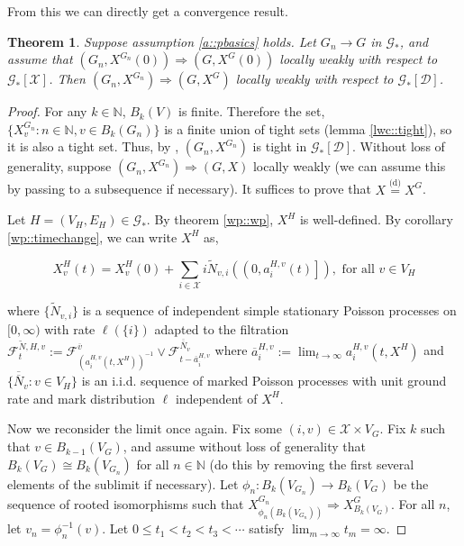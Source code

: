 \documentclass[12pt]{article}
\newcommand{\mb}{\mathbb}
\newcommand{\mc}{\mathcal}
\newcommand{\ra}{\rightarrow}
\newcommand{\ov}{\overline}
\newcommand{\te}{\text}
\newcommand{\ind}{\hspace{24pt}}
\newcommand{\deq}{\overset{\text{(d)}}{=}}			%
\newcommand{\defeq}{:=}								%
\newcommand{\cad}{\mc{D}}							%
\newcommand{\sta}{\mc{X}}							%
\newcommand{\cl}[1]{\ov{#1}}						%
\newcommand{\Xf}{X}									%
\newcommand{\poiss}{N}								%
\newcommand{\Sm}{\ell}								%
\newcommand{\F}{\mc{F}}								%
\newcommand{\poissv}[1]{_{#1}}						%
\newcommand{\vind}[1]{_{#1}}						%
\newcommand{\tme}[1]{(#1)}							%
\newcommand{\gind}[1]{^{#1}}						%
\newcommand{\vpara}[1]{^{#1}}						%
\newcommand{\stpara}[1]{_{#1}}						%
\newcommand{\tpara}[1]{_{#1}}						%
\newcommand{\gvpara}[2]{^{#1,#2}}					%
\newcommand{\tmepro}[2]{(#1,#2)}					%
\newcommand{\Gs}{\mc{G}_\ast}						%
\newcommand{\compen}{a}								%
\newcommand{\compenbd}{\ov{a}}						%
\newcommand{\binver}[1]{(#1)^{-1}}					%
\newcommand{\trnc}[1]{B_{#1}}						%
\renewcommand{\sp}[1]{[#1]}							%
\newcommand{\alt}[1]{\tilde{#1}}					%
\renewcommand{\it}[1]{_{#1}}						%
\newtheorem{thms}{Theorem}[section]
\begin{document}
From this we can directly get a convergence result.

\begin{thms}
Suppose assumption \ref{a::pbasics} holds. Let \(G\it{n} \ra G\) in \(\Gs\), and assume that \((G\it{n},\Xf\gind{G\it{n}}\tme{0}) \Rightarrow (G,\Xf\gind{G}\tme{0})\) locally weakly with respect to \(\Gs\sp{\sta}\). Then \((G\it{n},\Xf\gind{G\it{n}}) \Rightarrow (G,\Xf\gind{G})\) locally weakly with respect to \(\Gs\sp{\cad}\).
\label{lwc::lwcthm}
\end{thms}
\begin{proof}
For any \(k \in \mb{N}\), \(\trnc{k}(V)\) is finite. Therefore the set, \(\{\Xf\gind{G\it{n}}\vind{v}: n \in \mb{N}, v \in \trnc{k}(G\it{n})\}\) is a finite union of tight sets (lemma \ref{lwc::tight}), so it is also a tight set. Thus, by \cite[Lemma A.6]{LacRamWu19}, \((G\it{n},\Xf\gind{G\it{n}})\) is tight in \(\Gs\sp{\cad}\). Without loss of generality, suppose \((G\it{n},\Xf\gind{G\it{n}}) \Rightarrow (G,\Xf)\) locally weakly (we can assume this by passing to a subsequence if necessary). It suffices to prove that \(\Xf \deq \Xf\gind{G}\).

\ind Let \(H = (V_H,E_H)\in \Gs\). By theorem \ref{wp::wp}, \(\Xf\gind{H}\) is well-defined. By corollary \ref{wp::timechange}, we can write \(\Xf\gind{H}\) as,

\[\Xf\gind{H}\vind{v}\tme{t} = \Xf\gind{H}\vind{v}\tme{0} + \sum_{i\in \sta} i\alt{\poiss}_{v,i}\left(\left(0, \compen\gvpara{H}{v}\stpara{i}\tme{t}\right]\right),\te{ for all } v \in V_H\]

where \(\{\alt{\poiss}_{v,i}\}\) is a sequence of independent simple stationary Poisson processes on \([0,\infty)\) with rate \(\Sm(\{i\})\) adapted to the filtration \(\F\vpara{\alt{N},H,v}\tpara{t} \defeq \F\vpara{\cl{v}}\tpara{\binver{\compen\gvpara{H}{v}\stpara{i}\tmepro{t}{\Xf\gind{H}}}}\vee\F\tpara{t - \compenbd\gvpara{H}{v}\stpara{i}}^{\ov{\ov{N}}\poissv{v}}\) where \(\compenbd\gvpara{H}{v}\stpara{i} \defeq \lim_{t\ra\infty} \compen\gvpara{H}{v}\stpara{i}\tmepro{t}{\Xf\gind{H}}\) and \(\{\ov{\ov{\poiss}}\poissv{v}:v\in V_H\}\) is an i.i.d. sequence of marked Poisson processes with unit ground rate and mark distribution \(\Sm\) independent of \(\Xf\gind{H}\).

\ind Now we reconsider the limit once again. Fix some \((i,v) \in \sta\times V_G\). Fix \(k\) such that \(v \in B_{k-1}(V_G)\), and assume without loss of generality that \(B_k(V_G) \cong B_k(V_{G_n})\) for all \(n\in \mb{N}\) (do this by removing the first several elements of the sublimit if necessary). Let \(\phi_n: B_k(V_{G_n}) \ra B_k(V_G)\) be the sequence of rooted isomorphisms such that \(\Xf\gind{G_n}\vind{\phi_n(B_k(V_{G_n}))} \Rightarrow \Xf\gind{G}\vind{B_k(V_G)}\). For all \(n\), let \(v_n = \phi_n^{-1}(v)\). Let \(0\leq t_1 < t_2 < t_3<\cdots\) satisfy \(\lim_{m\ra\infty} t_m = \infty\). 


\end{proof}
\end{document}
